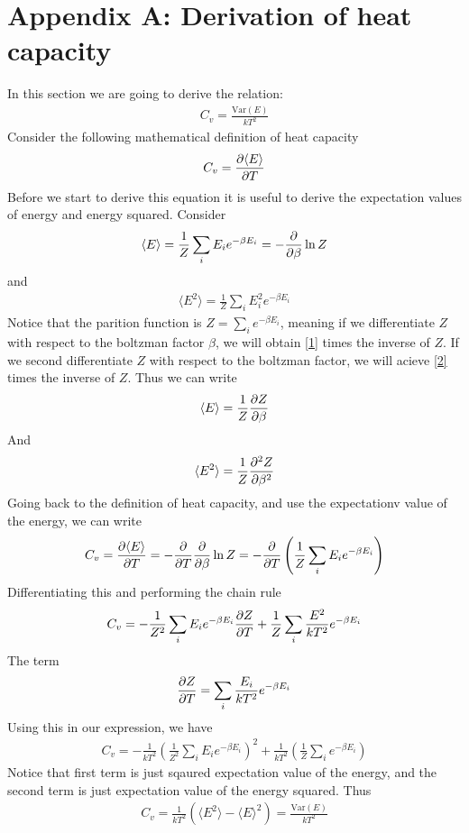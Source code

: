 \documentclass[a4paper, 10pt]{article}
\begin{document}
\section{Appendix A: Derivation of heat capacity \label{heat capacity}}
In this section we are going to derive the relation:
\begin{align}
  C_{v} = \frac{\mathrm{Var}(E)}{kT^{2}}
\end{align}
Consider the following mathematical definition of heat capacity
\begin{align}
  C_{v} = \pdv{\langle E \rangle}{T}
\end{align}
Before we start to derive this equation it is useful to derive the expectation values of energy and energy squared.
Consider
\begin{align}
  \langle E \rangle = \frac{1}{Z}\sum_{i}E_{i} e^{-\beta E_{i}} = -\pdv{\beta}\ln{Z}
  \label{1}
\end{align}
and
\begin{align}
  \langle E^{2} \rangle = \frac{1}{Z}\sum_{i}E_{i}^{2} e^{-\beta E_{i}}
  \label{2}
\end{align}
 Notice that the parition function is $Z = \sum_{i} e^{-\beta E_{i}}$, meaning if we differentiate
 $Z$ with respect to the boltzman factor $\beta$, we will obtain \eqref{1} times the inverse of $Z$. If we second differentiate $Z$ with respect
 to the boltzman factor, we will acieve \eqref{2} times the inverse of $Z$. Thus we can write
 \begin{align}
     \langle E \rangle = \frac{1}{Z} \pdv{Z}{\beta}
 \end{align}
 And
 \begin{align}
   \langle E^{2} \rangle = \frac{1}{Z} \pdv[2]{Z}{\beta}
\end{align}
Going back to the definition of heat capacity, and use the expectationv value of the energy, we can write
\begin{align}
    C_{v} = \pdv{\langle E \rangle}{T} = - \pdv{T}\pdv{\beta}\ln{Z} = - \pdv{T}\left( \frac{1}{Z}\sum_{i}E_{i} e^{-\beta E_{i}} \right)
\end{align}
Differentiating this and performing the chain rule
\begin{align}
    C_{v} = -\frac{1}{Z^{2}}\sum_{i}E_{i}e^{-\beta E_{i}}\pdv{Z}{T} + \frac{1}{Z}\sum_{i}\frac{E^{2}}{kT^{2}}e^{-\beta E_{i}}
\end{align}
The term
\begin{align}
  \pdv{Z}{T} = \sum_{i}\frac{E_{i}}{kT^{2}}e^{-\beta E_{i}}
\end{align}
Using this in our expression, we have
\begin{align}
    C_{v} = -\frac{1}{kT^{2}}\left(\frac{1}{Z^{2}}\sum_{i}E_{i}e^{-\beta E_{i}}\right)^{2}
    + \frac{1}{kT^{2}}\left(\frac{1}{Z}\sum_{i}e^{-\beta E_{i}}\right)
\end{align}
Notice that first term is just sqaured expectation value of the energy, and the second term is just expectation value of the energy squared.
Thus
\begin{align}
  C_{v} = \frac{1}{kT^{2}}\left(\langle E^{2} \rangle - \langle E \rangle^{2}\right) = \frac{\mathrm{Var}(E)}{kT^{2}}
\end{align}
\end{document}
